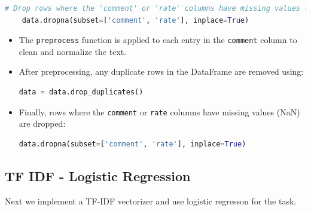 \documentclass{solutionclass} %
\begin{document}
\begin{solution}
\begin{lstlisting}[language=Python]
    # Drop rows where the 'comment' or 'rate' columns have missing values (NaN)
    data.dropna(subset=['comment', 'rate'], inplace=True)
    \end{lstlisting}
    
    \begin{itemize}
        \item The \texttt{preprocess} function is applied to each entry in the \texttt{comment} column to clean and normalize the text.
        \item After preprocessing, any duplicate rows in the DataFrame are removed using:
        \begin{lstlisting}[language=Python]
        data = data.drop_duplicates()
        \end{lstlisting}
        \item Finally, rows where the \texttt{comment} or \texttt{rate} columns have missing values (NaN) are dropped:
        \begin{lstlisting}[language=Python]
        data.dropna(subset=['comment', 'rate'], inplace=True)
        \end{lstlisting}
    \end{itemize}
    
\end{solution}




\subsection*{TF IDF - Logistic Regression}

Next we implement a TF-IDF vectorizer and use logistic regresson for the task.
\end{document}
